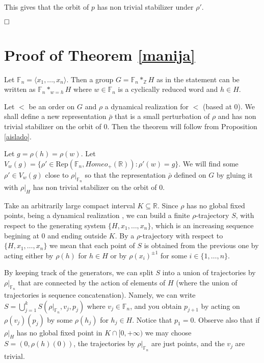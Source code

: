 \documentclass[12pt]{article}
\newcommand{\F}{\mathbb{F}}
\newcommand{\R}{\mathbb{R}}
\newcommand{\Z}{\mathbb Z}
\theoremstyle{definition}
\begin{document}
This gives that the orbit of $p$ has non trivial stabilizer under $\rho'$.





$\hfill \Box$






\section{Proof of Theorem \ref{manija}}

Let $\F_n = \langle x_1,...,x_n\rangle$. Then a group $G = \F_n*_{\Z}H$ as in the statement can be written as $\F_n*_{w=h}H$ where $w\in\F_n$ is a cyclically reduced word and $h\in H$.   

Let $<$ be an order on $G$ and $\rho$ a dynamical realization for $<$ (based at 0). We shall define a new representation $\bar\rho$ that is a small perturbation of $\rho$ and has non trivial stabilizer on the orbit of 0. Then the theorem will follow from Proposition \ref{aislado}. 

Let $g=\rho(h)=\rho(w)$. Let $V_{w}(g) = \{\rho'\in\text{Rep}(\F_n,Homeo_{+}(\R)): \rho'(w)=g \}$. We will find some $\rho'\in V_{w}(g)$ close to $\rho|_{\F_n}$ so that the representation $\bar\rho$ defined on $G$ by gluing it with $\rho|_H$ has non trivial stabilizer on the orbit of 0. 




Take an arbitrarily large compact interval $K\subseteq \R$. Since $\rho$ has no global fixed points, being a dynamical realization \cite{GOD}, we can build a finite $\rho$-trajectory $S$, with respect to the generating system $\{H,x_1,\ldots,x_n\}$, which is an increasing sequence begining at $0$ and ending outside $K$. By a $\rho$-trajectory with respect to $\{H,x_1,\ldots,x_n\}$ we mean that each point of $S$ is obtained from the previous one by acting either by $\rho(h)$ for $h\in H$ or by $\rho(x_i)^{\pm 1}$ for some $i\in\{1,\ldots,n\}$.  

By keeping track of the generators, we can split $S$ into a union of trajectories by $\rho|_{\F_n}$ that are connected by the action of elements of $H$ (where the union of trajectories is sequence concatenation). Namely, we can write $S=\bigcup_{j=1}^k S(\rho|_{\F_n},v_j,p_j)$ where $v_j\in\F_n$, and you obtain $p_{j+1}$ by acting on $\rho(v_j)(p_j)$  by some $\rho(h_j)$ for $h_j\in H$. Notice that $p_1=0$. Observe also that if $\rho|_H$ has no global fixed point in $K\cap[0,+\infty)$ we may choose $S=(0,\rho(h)(0))$, the trajectories by $\rho|_{\F_n}$ are just points, and the $v_j$ are trivial. 
\end{document}

